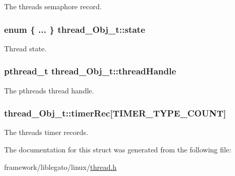 The thread\textquotesingle{}s semaphore record. 

\subsubsection[{\texorpdfstring{state}{state}}]{\setlength{\rightskip}{0pt plus 5cm}enum \{ ... \} 
     thread\+\_\+\+Obj\+\_\+t\+::state}\hypertarget{structthread___obj__t_a425d109a4c74ba9fd610c8e4050200db}{}\label{structthread___obj__t_a425d109a4c74ba9fd610c8e4050200db}


Thread state. 

\subsubsection[{\texorpdfstring{thread\+Handle}{threadHandle}}]{\setlength{\rightskip}{0pt plus 5cm}pthread\+\_\+t thread\+\_\+\+Obj\+\_\+t\+::thread\+Handle}\hypertarget{structthread___obj__t_a813ff532b3b455d01711ae9310efcd8b}{}\label{structthread___obj__t_a813ff532b3b455d01711ae9310efcd8b}


The pthreads thread handle. 

\subsubsection[{\texorpdfstring{timer\+Rec}{timerRec}}]{ thread\+\_\+\+Obj\+\_\+t\+::timer\+Rec\mbox{[}{\bf T\+I\+M\+E\+R\+\_\+\+T\+Y\+P\+E\+\_\+\+C\+O\+U\+NT}\mbox{]}}\hypertarget{structthread___obj__t_a634ddcc7916e806a6a91bdc49b6c2b12}{}\label{structthread___obj__t_a634ddcc7916e806a6a91bdc49b6c2b12}


The thread\textquotesingle{}s timer records. 



The documentation for this struct was generated from the following file\+:\begin{DoxyCompactItemize}
\item 
framework/liblegato/linux/\hyperlink{thread_8h}{thread.\+h}\end{DoxyCompactItemize}
